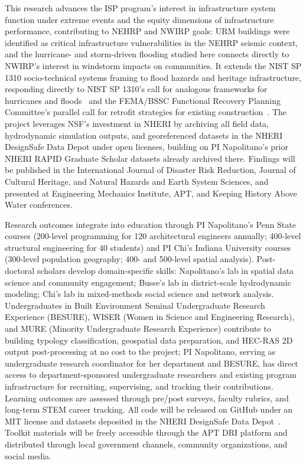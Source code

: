 \documentclass[11pt]{article}
\begin{document}
This research advances the ISP program's interest in infrastructure system
function under extreme events and the equity dimensions of infrastructure
performance, contributing to NEHRP and NWIRP goals: URM buildings were identified as critical infrastructure vulnerabilities in the NEHRP seismic
context, and the hurricane- and storm-driven flooding studied here connects
directly to NWIRP's interest in windstorm impacts on communities.
It extends the NIST SP 1310 socio-technical systems framing to flood hazards
and heritage infrastructure, responding directly to NIST SP 1310's call for
analogous frameworks for hurricanes and floods~\cite{NIST2024SP1310} and the
FEMA/BSSC Functional Recovery Planning Committee's parallel call for retrofit
strategies for existing construction~\cite{NIBSFunctionalRecovery2023}.
The project leverages NSF's investment in NHERI by archiving all field data,
hydrodynamic simulation outputs, and georeferenced datasets in the NHERI
DesignSafe Data Depot under open licenses, building on PI Napolitano's prior
NHERI RAPID Graduate Scholar datasets already archived there.
Findings will be published in the International Journal of Disaster Risk Reduction,
Journal of Cultural Heritage, and Natural Hazards and Earth System Sciences, and
presented at Engineering Mechanics Institute, APT, and Keeping History Above Water
conferences.

Research outcomes integrate into education through PI Napolitano's Penn State
courses (200-level programming for 120 architectural engineers annually; 400-level
structural engineering for 40 students) and PI Chi's Indiana University courses
(300-level population geography; 400- and 500-level spatial analysis).
Post-doctoral scholars develop domain-specific skills: Napolitano's lab in spatial
data science and community engagement; Busse's lab in district-scale hydrodynamic
modeling; Chi's lab in mixed-methods social science and network analysis.
Undergraduates in Built Environment Seminal Undergraduate Research Experience
(BESURE), WISER (Women in Science and Engineering Research), and MURE (Minority
Undergraduate Research Experience) contribute to building typology classification,
geospatial data preparation, and HEC-RAS 2D output post-processing at no cost to
the project; PI Napolitano, serving as undergraduate research coordinator for her
department and BESURE, has direct access to department-sponsored undergraduate
researchers and existing program infrastructure for recruiting, supervising, and
tracking their contributions.
Learning outcomes are assessed through pre/post surveys, faculty rubrics, and
long-term STEM career tracking.
All code will be released on GitHub under an MIT license and datasets deposited
in the NHERI DesignSafe Data Depot~\cite{maalouf2024data,maalouf2026data}.
Toolkit materials will be freely accessible through the APT DRI platform and
distributed through local government channels, community organizations, and
social media.
\vspace{-0.4cm}
\end{document}
